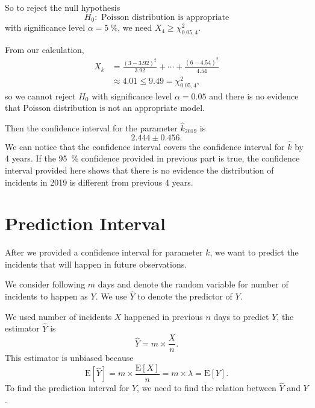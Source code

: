 \documentclass[11pt,a4paper,english]{article}
\begin{document}
So to reject the null hypothesis 
\begin{equation*}
	H_{0}:\text{ Poisson distribution is appropriate}
\end{equation*}
with significance level $\alpha = \SI{5}{\percent}$, we need $X_{4} \geq \chi^{2}_{0.05,4}$.

From our calculation,
\begin{align*}
	X_{k} &= \frac{(3-3.92)^{2}}{3.92}+\cdots+\frac{(6-4.54)^{2}}{4.54}\\
	&\approx 4.01 \leq 9.49  = \chi^{2}_{0.05,4},
\end{align*}
so we cannot reject $H_{0}$ with significance level $\alpha = 0.05$ and there is no evidence that Poisson distribution is not an appropriate model.

Then the confidence interval for the parameter $\hat{k}_{2019}$ is 
\begin{equation*}
	2.444 \pm 0.456.
\end{equation*}
We can notice that the confidence interval covers the confidence interval for $\hat{k}$ by 4 years. If the \SI{95}{\percent} confidence provided in previous part is true, the confidence interval provided here shows that there is no evidence the distribution of incidents in 2019 is different from previous 4 years. 
\section{Prediction Interval}
After we provided a confidence interval for parameter $k$, we want to predict the incidents that will happen in future observations.

We consider following $m$ days and denote the random variable for number of incidents to happen as $Y$. We use $\hat{Y}$ to denote the predictor of $Y$.

We used number of incidents $X$ happened in previous $n$ days to predict $Y$, the estimator $\hat{Y}$ is 
\begin{equation*}
\hat{Y} = m \times \frac{X}{n}.
\end{equation*}
This estimator is unbiased because 
\begin{equation*}
	\text{E}[\hat{Y}] = m \times \frac{\text{E}[X]}{n} = m \times \lambda = \text{E}[Y].
\end{equation*}
To find the prediction interval for $Y$, we need to find the relation between $\hat{Y}$ and $Y$.
\end{document}
